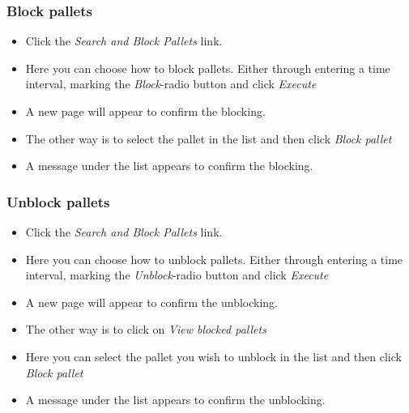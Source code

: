 \documentclass[a4paper]{article}
\begin{document}
\subsubsection{Block pallets}
\begin{itemize}
	\item Click the \emph{Search and Block Pallets} link.
	\item Here you can choose how to block pallets. Either through entering a time interval, marking the \emph{Block}-radio button and click \emph{Execute} 
	\item A new page will appear to confirm the blocking.
	\item The other way is to select the pallet in the list and then click \emph{Block pallet}
	\item A message under the list appears to confirm the blocking.
\end{itemize}
\subsubsection{Unblock pallets}
\begin{itemize}
	\item Click the \emph{Search and Block Pallets} link.
	\item Here you can choose how to unblock pallets. Either through entering a time interval, marking the \emph{Unblock}-radio button and click \emph{Execute} 
	\item A new page will appear to confirm the unblocking.
	\item The other way is to click on \emph{View blocked pallets}
	\item Here you can select the pallet you wish to unblock in the list and then click \emph{Block pallet}
	\item A message under the list appears to confirm the unblocking.
\end{itemize}
\end{document}
